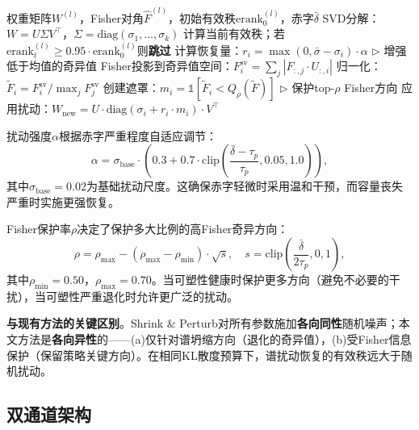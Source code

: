 \documentclass[twocolumn]{article}
\newcommand{\erank}{\mathrm{erank}}
\begin{document}
\begin{algorithm}[H]
\caption{Fisher引导的谱扰动}
\label{alg:perturb}
\begin{algorithmic}[1]
\REQUIRE 权重矩阵$W^{(l)}$，Fisher对角$\hat{F}^{(l)}$，初始有效秩$\erank_0^{(l)}$，赤字$\bar{\delta}$
\STATE SVD分解：$W = U \Sigma V^\top$，$\Sigma = \text{diag}(\sigma_1, \ldots, \sigma_k)$
\STATE 计算当前有效秩；若$\erank_t^{(l)} \geq 0.95 \cdot \erank_0^{(l)}$则\textbf{跳过}
\STATE 计算恢复量：$r_i = \max(0, \bar{\sigma} - \sigma_i) \cdot \alpha$ \hfill $\triangleright$ 增强低于均值的奇异值
\STATE Fisher投影到奇异值空间：$F_i^{\text{sv}} = \sum_j |F_{:,j} \cdot U_{:,i}|$
\STATE 归一化：$\tilde{F}_i = F_i^{\text{sv}} / \max_j F_j^{\text{sv}}$
\STATE 创建遮罩：$m_i = \mathbb{1}[\tilde{F}_i < Q_\rho(\tilde{F})]$ \hfill $\triangleright$ 保护top-$\rho$ Fisher方向
\STATE 应用扰动：$W_{\text{new}} = U \cdot \text{diag}(\sigma_i + r_i \cdot m_i) \cdot V^\top$
\end{algorithmic}
\end{algorithm}

扰动强度$\alpha$根据赤字严重程度自适应调节：
\begin{equation}
    \alpha = \sigma_{\text{base}} \cdot \left(0.3 + 0.7 \cdot \text{clip}\!\left(\frac{\bar{\delta} - \tau_p}{\tau_p}, 0.05, 1.0\right)\right),
    \label{eq:alpha}
\end{equation}
其中$\sigma_{\text{base}} = 0.02$为基础扰动尺度。这确保赤字轻微时采用温和干预，而容量丧失严重时实施更强恢复。

Fisher保护率$\rho$决定了保护多大比例的高Fisher奇异方向：
\begin{equation}
    \rho = \rho_{\max} - (\rho_{\max} - \rho_{\min}) \cdot \sqrt{s}, \quad s = \text{clip}\!\left(\frac{\bar{\delta}}{2\tau_p}, 0, 1\right),
    \label{eq:adaptive_protect}
\end{equation}
其中$\rho_{\min} = 0.50$，$\rho_{\max} = 0.70$。当可塑性健康时保护更多方向（避免不必要的干扰），当可塑性严重退化时允许更广泛的扰动。

\textbf{与现有方法的关键区别}。Shrink \& Perturb\cite{ash2020warm}对所有参数施加\textbf{各向同性}随机噪声；本文方法是\textbf{各向异性}的——(a)仅针对谱坍缩方向（退化的奇异值），(b)受Fisher信息保护（保留策略关键方向）。在相同KL散度预算下，谱扰动恢复的有效秩远大于随机扰动。


\subsection{双通道架构}
\label{sec:dual}
\end{document}
